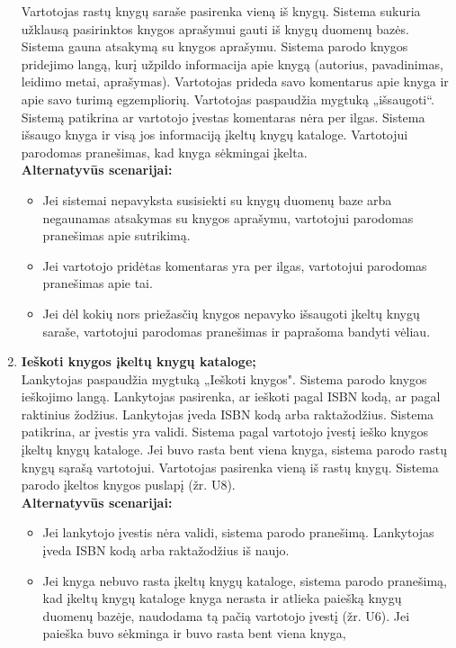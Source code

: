 \documentclass{VUMIFPSkursinis}
\begin{document}
\begin{enumerate}[label=\textbf{U\arabic*.}]
				Vartotojas rastų knygų saraše pasirenka vieną iš knygų. Sistema sukuria užklausą pasirinktos knygos aprašymui gauti iš knygų duomenų bazės. 
				Sistema gauna atsakymą su knygos aprašymu. Sistema parodo knygos pridejimo langą, 
				kurį užpildo informacija apie knygą (autorius, pavadinimas, leidimo metai, aprašymas). Vartotojas prideda savo komentarus apie knyga ir apie
				savo turimą egzempliorių. Vartotojas paspaudžia mygtuką „išsaugoti“. Sistemą patikrina ar vartotojo įvestas komentaras nėra per ilgas.
				Sistema išsaugo knyga ir visą jos informaciją įkeltų knygų kataloge. Vartotojui parodomas pranešimas, kad knyga sėkmingai įkelta.\\
				\textbf{Alternatyvūs scenarijai:}
				\begin{itemize}
					\item Jei sistemai nepavyksta susisiekti su knygų duomenų baze arba negaunamas atsakymas su knygos aprašymu, vartotojui parodomas pranešimas apie sutrikimą.
					\item Jei vartotojo pridėtas komentaras yra per ilgas, vartotojui parodomas pranešimas apie tai.
					\item Jei dėl kokių nors priežasčių knygos nepavyko išsaugoti įkeltų knygų saraše, vartotojui parodomas pranešimas ir paprašoma bandyti vėliau.
				\end{itemize}
			\item \textbf{Ieškoti knygos įkeltų knygų kataloge;}\\
				Lankytojas paspaudžia mygtuką „Ieškoti knygos". Sistema parodo knygos ieškojimo langą.
				Lankytojas pasirenka, ar ieškoti pagal ISBN kodą, ar pagal raktinius žodžius. 
				Lankytojas įveda ISBN kodą arba raktažodžius. Sistema patikrina, ar įvestis yra validi.
				Sistema pagal vartotojo įvestį ieško knygos įkeltų knygų kataloge. 
				Jei buvo rasta bent viena knyga, sistema parodo rastų knygų sąrašą vartotojui. Vartotojas pasirenka vieną iš rastų knygų.
				Sistema parodo įkeltos knygos puslapį (žr. U8).\\
				\textbf{Alternatyvūs scenarijai:}
				\begin{itemize}
					\item Jei lankytojo įvestis nėra validi, sistema parodo pranešimą. Lankytojas įveda ISBN kodą arba raktažodžius iš naujo.
					\item Jei knyga nebuvo rasta įkeltų knygų kataloge, sistema parodo pranešimą, kad įkeltų knygų kataloge knyga nerasta 
						ir atlieka paiešką knygų duomenų bazėje, naudodama tą pačią vartotojo įvestį (žr. U6). Jei paieška buvo sėkminga ir buvo rasta bent viena knyga, 

\end{itemize}
\end{enumerate}
\end{document}
